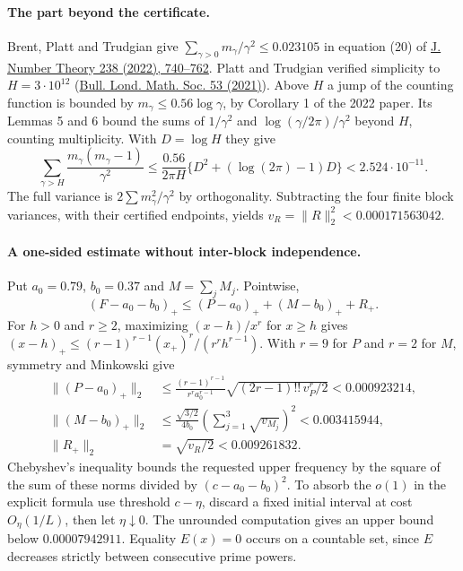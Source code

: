 \paragraph{The part beyond the certificate.}
Brent, Platt and Trudgian give $\sum_{\gamma>0}m_\gamma/\gamma^2\le0.023105$
in equation (20) of \href{https://maths-people.anu.edu.au/brent/pd/rpb274-final.pdf}{J. Number Theory 238 (2022), 740--762}.
Platt and Trudgian verified simplicity to $H=3\cdot10^{12}$
(\href{https://doi.org/10.1112/blms.12460}{Bull. Lond. Math. Soc. 53 (2021)}).
Above $H$ a jump of the counting function is bounded by
$m_\gamma\le0.56\log\gamma$, by Corollary 1 of the 2022 paper.
Its Lemmas 5 and 6 bound the sums of $1/\gamma^2$ and
$\log(\gamma/2\pi)/\gamma^2$ beyond $H$, counting multiplicity.
With $D=\log H$ they give
\[
 \sum_{\gamma>H}\frac{m_\gamma(m_\gamma-1)}{\gamma^2}
 \le\frac{0.56}{2\pi H}\{D^2+(\log(2\pi)-1)D\}<2.524\cdot10^{-11}.
\]
The full variance is $2\sum m_\gamma^2/\gamma^2$ by orthogonality.
Subtracting the four finite block variances, with their certified
endpoints, yields $v_R=\|R\|_2^2<0.000171563042$.

\paragraph{A one-sided estimate without inter-block independence.}
Put $a_0=0.79$, $b_0=0.37$ and $M=\sum_j M_j$. Pointwise,
\[
 (F-a_0-b_0)_+\le(P-a_0)_+ +(M-b_0)_+ + R_+ .
\]
For $h>0$ and $r\ge2$, maximizing $(x-h)/x^r$ for $x\ge h$ gives
$(x-h)_+\le (r-1)^{r-1}(x_+)^r/(r^r h^{r-1})$.
With $r=9$ for $P$ and $r=2$ for $M$, symmetry and Minkowski give
\begin{align*}
 \|(P-a_0)_+\|_2 &\le
 \frac{(r-1)^{r-1}}{r^ra_0^{r-1}}\sqrt{(2r-1)!!\,v_P^r/2}<0.000923214,\\
 \|(M-b_0)_+\|_2 &\le
 \frac{\sqrt{3/2}}{4b_0}\left(\sum_{j=1}^3\sqrt{v_{M_j}}\right)^2<0.003415944,\\
 \|R_+\|_2&=\sqrt{v_R/2}<0.009261832.
\end{align*}
Chebyshev's inequality bounds the requested upper frequency by the
square of the sum of these norms divided by $(c-a_0-b_0)^2$.
To absorb the $o(1)$ in the explicit formula use threshold $c-\eta$,
discard a fixed initial interval at cost $O_\eta(1/L)$, then let
$\eta\downarrow0$. The unrounded computation gives an upper bound
below $0.00007942911$. Equality $E(x)=0$ occurs on a countable set,
since $E$ decreases strictly between consecutive prime powers.

